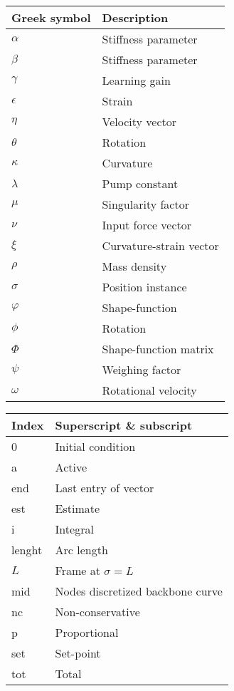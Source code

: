 \begin{spacing}{0.9}
\begin{multicols}{2}
\begin{table}[H]
\centering
    \begin{tabular}{p{2.8cm} p{3.2cm}} \hline
    \textbf{Greek symbol}    &   \textbf{Description }\\ \hline
    $\alpha$     &  Stiffness parameter \\
    $\beta$     &  Stiffness parameter \\
    $\gamma$     & Learning gain \\
    $\epsilon$     &  Strain \\
    $\eta$     &  Velocity vector \\
    $\theta$      & Rotation \\
    $\kappa$     &  Curvature \\
    $\lambda$    &  Pump constant \\
    $\mu$     & Singularity factor \\
    $\nu$     &  Input force vector \\
    $\xi$     &  Curvature-strain vector \\
    $\rho$     &  Mass density \\
    $\sigma$     &  Position instance \\
    $\varphi$     &  Shape-function \\
    $\phi$       & Rotation  \\
    $\Phi$    &  Shape-function matrix \\
    $\psi$        & Weighing factor \\
    $\omega$     &  Rotational velocity \\ \hline

    
    \end{tabular}
\end{table}


\begin{table}[H]
\centering
    \begin{tabular}{p{1.5cm} p{5cm}} \hline
    \textbf{Index}    &   \textbf{Superscript \& subscript}\\ \hline
    0     &  Initial condition \\
    a     &  Active \\
    end   & Last entry of vector \\
    est   & Estimate \\
    i     & Integral \\
    lenght & Arc length \\
    $L$   & Frame at $\sigma = L$ \\
    mid    & Nodes discretized backbone curve \\
    nc    & Non-conservative \\
    p    & Proportional \\
    set   & Set-point \\
    tot    & Total \\
    \end{tabular}
\end{table}







\end{multicols}
\end{spacing}
